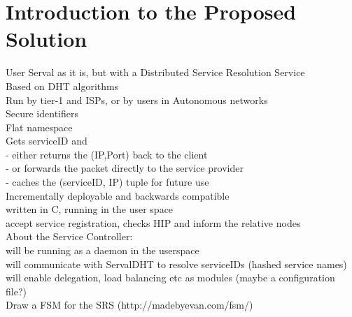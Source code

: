 \section{Introduction to the Proposed Solution}
User Serval as it is, but with a Distributed Service Resolution Service
\\Based on DHT algorithms
\\Run by tier-1 and ISPs, or by users in Autonomous networks
\\Secure identifiers
\\Flat namespace
\\Gets serviceID and
\\- either returns the (IP,Port) back to the client
\\- or forwards the packet directly to the service provider
\\- caches the (serviceID, IP) tuple for future use
\\Incrementally deployable and backwards compatible
\\written in C, running in the user space
\\accept service registration, checks HIP and inform the relative nodes
\\About the Service Controller:
\\will be running as a daemon in the userspace
\\will communicate with ServalDHT to resolve serviceIDs (hashed service names)
\\will enable delegation, load balancing etc as modules (maybe a configuration file?)
\\Draw a FSM for the SRS  (http://madebyevan.com/fsm/)
\fi

